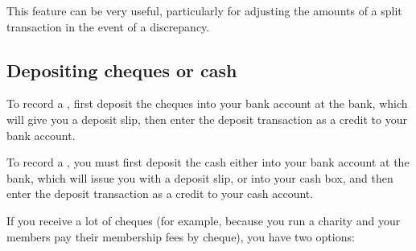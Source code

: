 This feature can be very useful, particularly for adjusting the amounts of a split transaction in the event of a discrepancy.


\subsection{Depositing cheques or cash\label{transactions-new-cheque}}

To record a , first deposit the cheques into your bank account at the bank, which will give you a deposit slip, then enter the deposit transaction as a credit to your bank account.

To record a , you must first deposit the cash either into your bank account at the bank, which will issue you with a deposit slip, or into your cash box, and then enter the deposit transaction as a credit to your cash account.

If you receive a lot of cheques (for example, because you run a charity and your members pay their membership fees by cheque), you have two options:

